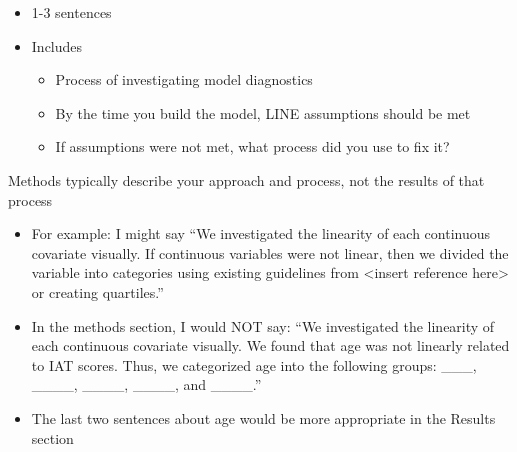 \documentclass[
  letterpaper,
  DIV=11,
  numbers=noendperiod]{scrartcl}
\providecommand{\tightlist}{%
  \setlength{\itemsep}{0pt}\setlength{\parskip}{0pt}}\usepackage{longtable,booktabs,array}
\begin{document}
\begin{itemize}
\begin{itemize}
    \begin{itemize}
    \tightlist
    \item
      1-3 sentences
    \item
      Includes

      \begin{itemize}
      \tightlist
      \item
        Process of investigating model diagnostics
      \item
        By the time you build the model, LINE assumptions should be met
      \item
        If assumptions were not met, what process did you use to fix it?
      \end{itemize}
    \end{itemize}
  \end{itemize}
\end{itemize}

\begin{tcolorbox}[enhanced jigsaw, opacityback=0, opacitybacktitle=0.6, rightrule=.15mm, toprule=.15mm, left=2mm, toptitle=1mm, breakable, colback=white, bottomtitle=1mm, arc=.35mm, leftrule=.75mm, titlerule=0mm, title=\textcolor{quarto-callout-caution-color}{\faFire}\hspace{0.5em}{Important to keep in mind}, bottomrule=.15mm, coltitle=black, colbacktitle=quarto-callout-caution-color!10!white, colframe=quarto-callout-caution-color-frame]

Methods typically describe your approach and process, not the results of
that process

\begin{itemize}
\tightlist
\item
  For example: I might say ``We investigated the linearity of each
  continuous covariate visually. If continuous variables were not
  linear, then we divided the variable into categories using existing
  guidelines from \textless insert reference here\textgreater{} or
  creating quartiles.''
\item
  In the methods section, I would NOT say: ``We investigated the
  linearity of each continuous covariate visually. We found that age was
  not linearly related to IAT scores. Thus, we categorized age into the
  following groups: \_\_\_, \_\_\_\_, \_\_\_\_, \_\_\_\_, and
  \_\_\_\_.''
\item
  The last two sentences about age would be more appropriate in the
  Results section
\end{itemize}

\end{tcolorbox}
\end{document}
